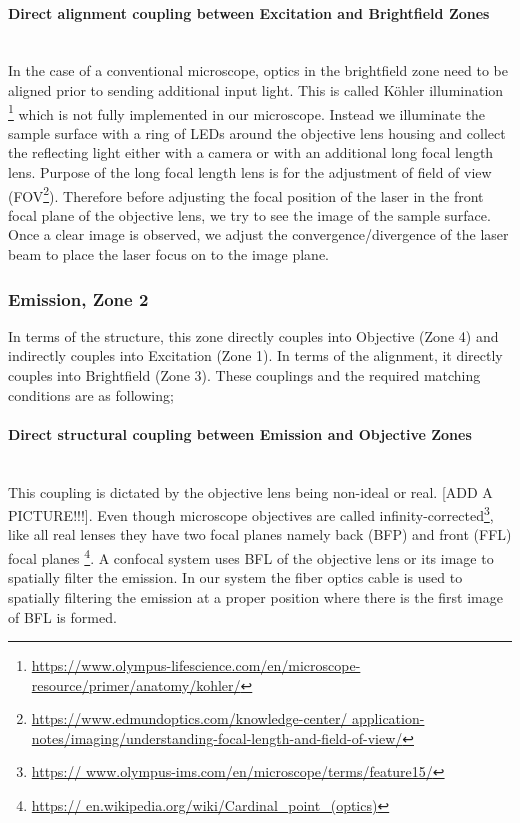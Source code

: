 \paragraph{Direct alignment coupling between Excitation and Brightfield Zones}\mbox{}\\
In the case of a conventional microscope, optics in the brightfield zone need to be aligned
prior to sending additional input light. This is called K\"{o}hler illumination
\footnote{\url{https://www.olympus-lifescience.com/en/microscope-resource/primer/anatomy/kohler/}}
which is not fully implemented in our microscope. Instead we illuminate the sample surface with
a ring of LEDs around the objective lens housing and collect the reflecting light either with
a camera or with an additional long focal length lens. Purpose of the long focal length lens is 
for the adjustment of field of view (FOV\footnote{\url{https://www.edmundoptics.com/knowledge-center/
		application-notes/imaging/understanding-focal-length-and-field-of-view/}}). Therefore
before adjusting the focal position of the laser in the front focal plane of the objective lens,
we try to see the image of the sample surface. Once a clear image is observed, we adjust the 
convergence/divergence of the laser beam to place the laser focus on to the image plane.

\subsubsection{Emission, Zone 2}
In terms of the structure, this zone directly couples into Objective (Zone 4) and indirectly couples 
into Excitation (Zone 1). In terms of the alignment, it directly couples into Brightfield (Zone 3).
These couplings and the required matching conditions are as following;

\paragraph{Direct structural coupling between Emission and Objective Zones}\mbox{}\\
This coupling is dictated by the objective lens being non-ideal or real. [ADD A PICTURE!!!].
Even though microscope objectives are called infinity-corrected\footnote{\url{https://
		www.olympus-ims.com/en/microscope/terms/feature15/}}, like all real lenses they have 
two focal planes namely back (BFP) and front (FFL) focal planes \footnote{\url{https://
		en.wikipedia.org/wiki/Cardinal_point_(optics)}}. A confocal system uses BFL of the 
objective lens or its image to spatially filter the emission. In our system the fiber optics 
cable is used to spatially filtering the emission at a proper position where there is the first
image of BFL is formed.

